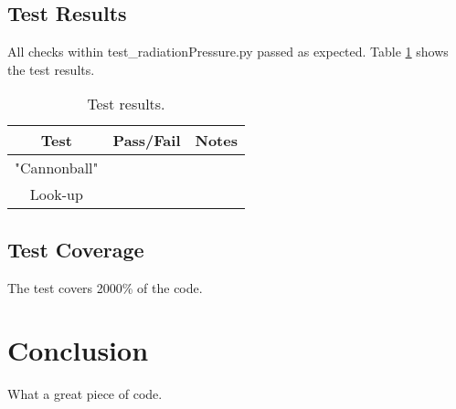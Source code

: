 \documentclass[]{BasiliskReportMemo}
\newcommand{\testname}{test\_radiationPressure.py }
\begin{document}
\subsection{Test Results}

All checks within \testname passed as expected. Table \ref{tab:results} shows the test results.

\begin{table}[htbp]
	\caption{Test results.}
	\label{tab:results}
	\centering \fontsize{10}{10}\selectfont
	\begin{tabular}{c | c | c  } %
		\hline
		\textbf{Test} 				      & \textbf{Pass/Fail} 						   		   & \textbf{Notes} 									\\ \hline
		"Cannonball"	   			  	&      & 	 \\ \hline
		Look-up	   	                     &              &            \\ \hline
	\end{tabular}
\end{table}

\subsection{Test Coverage}
The test covers 2000\% of the code.
\section{Conclusion}
What a great piece of code.
\end{document}
